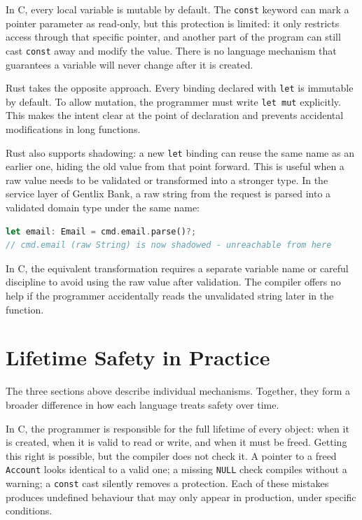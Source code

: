 In C, every local variable is mutable by default. The \texttt{const} keyword
can mark a pointer parameter as read-only, but this protection is limited: it
only restricts access through that specific pointer, and another part of the
program can still cast \texttt{const} away and modify the value. There is no
language mechanism that guarantees a variable will never change after it is
created.

Rust takes the opposite approach. Every binding declared with \texttt{let} is
immutable by default. To allow mutation, the programmer must write
\texttt{let mut} explicitly. This makes the intent clear at the point of
declaration and prevents accidental modifications in long functions.

Rust also supports shadowing: a new \texttt{let} binding can reuse the same
name as an earlier one, hiding the old value from that point forward. This is
useful when a raw value needs to be validated or transformed into a stronger
type. In the service layer of Gentlix Bank, a raw string from the request is
parsed into a validated domain type under the same name:

\begin{lstlisting}[language=Rust, caption={user.rs (service) --- Shadowing
replaces the raw String with a validated Email. After this line, the raw
value is unreachable; only the validated type exists in scope.}]
let email: Email = cmd.email.parse()?;
// cmd.email (raw String) is now shadowed - unreachable from here
\end{lstlisting}

In C, the equivalent transformation requires a separate variable name or
careful discipline to avoid using the raw value after validation. The compiler
offers no help if the programmer accidentally reads the unvalidated string
later in the function.

\section{Lifetime Safety in Practice}
\label{sec:ch3sec4}

The three sections above describe individual mechanisms. Together, they form a
broader difference in how each language treats safety over time.

In C, the programmer is responsible for the full lifetime of every object: when
it is created, when it is valid to read or write, and when it must be freed.
Getting this right is possible, but the compiler does not check it. A pointer
to a freed \texttt{Account} looks identical to a valid one; a missing
\texttt{NULL} check compiles without a warning; a \texttt{const} cast silently
removes a protection. Each of these mistakes produces undefined behaviour that
may only appear in production, under specific conditions.

